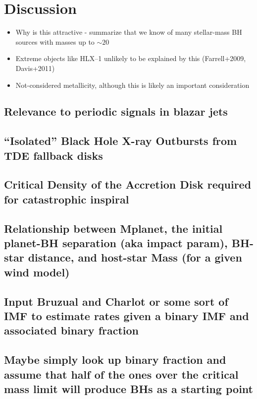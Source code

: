 \section{Discussion}\label{section:conc}

\begin{itemize}
\item Why is this attractive - summarize that we know of  many stellar-mass BH sources with masses up to $\sim20$
\item Extreme objects like HLX--1 unlikely to be explained by this (Farrell+2009, Davis+2011)
\item Not-considered metallicity, although this is likely an important consideration
\end{itemize}



\subsection{Relevance to periodic signals in blazar jets}


\subsection{``Isolated'' Black Hole X-ray Outbursts from TDE fallback disks} 


\subsection{Critical Density of the Accretion Disk required for catastrophic inspiral}


\subsection{Relationship between Mplanet,  the initial planet-BH separation (aka impact param),  BH-star distance, and host-star Mass (for a given wind model)}


\subsection{Input Bruzual and Charlot or some sort of IMF to estimate rates given a binary IMF and associated binary fraction}


\subsection{Maybe simply look up binary fraction and assume that half of the ones over the critical mass limit will produce BHs as a starting point}


